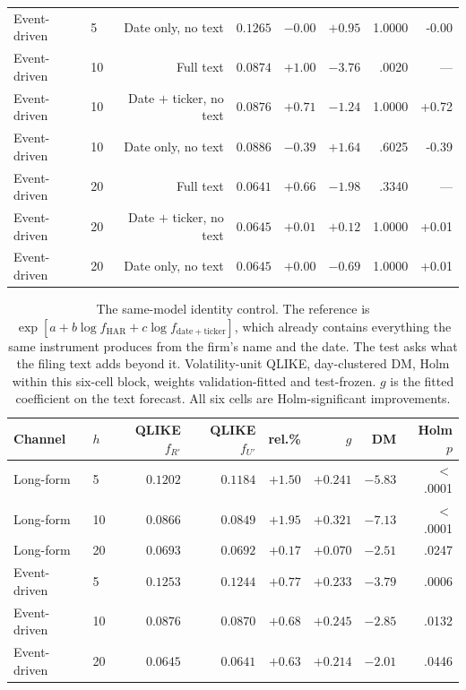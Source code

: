 \begin{table}[htbp]
\begin{tabular}{@{}llrrrrrr@{}}
Event-driven & 5 & Date only, no text & $0.1265$ & $-0.00$ & $+0.95$ & 1.0000 & -0.00 \\
\addlinespace
Event-driven & 10 & Full text & $0.0874$ & $+1.00$ & $-3.76$ & .0020 & --- \\
Event-driven & 10 & Date $+$ ticker, no text & $0.0876$ & $+0.71$ & $-1.24$ & 1.0000 & +0.72 \\
Event-driven & 10 & Date only, no text & $0.0886$ & $-0.39$ & $+1.64$ & .6025 & -0.39 \\
\addlinespace
Event-driven & 20 & Full text & $0.0641$ & $+0.66$ & $-1.98$ & .3340 & --- \\
Event-driven & 20 & Date $+$ ticker, no text & $0.0645$ & $+0.01$ & $+0.12$ & 1.0000 & +0.01 \\
Event-driven & 20 & Date only, no text & $0.0645$ & $+0.00$ & $-0.69$ & 1.0000 & +0.01 \\
\bottomrule
\end{tabular}
\end{table}

\begin{table}[htbp]
\centering
\caption[Full text beyond the model's own identity forecast]{The same-model
identity control. The reference is
$\exp[a + b\log f_{\mathrm{HAR}} + c\log f_{\mathrm{date+ticker}}]$, which
already contains everything the same instrument produces from the firm's
name and the date. The test asks what the filing text adds beyond
it. Volatility-unit QLIKE, day-clustered DM, Holm within this six-cell
block, weights validation-fitted and test-frozen. $g$ is the fitted
coefficient on the text forecast. All six cells are Holm-significant
improvements.}
\label{tab:app-contam-joint}
\singlespacing\small
\setlength{\tabcolsep}{4pt}
\begin{tabular}{@{}llrrrrrr@{}}
\toprule
Channel & $h$ & QLIKE $f_{R'}$ & QLIKE $f_{U'}$ & rel.\% & $g$ & DM & Holm $p$ \\
\midrule
Long-form & 5 & $0.1202$ & $0.1184$ & $+1.50$ & $+0.241$ & $-5.83$ & $<$.0001 \\
Long-form & 10 & $0.0866$ & $0.0849$ & $+1.95$ & $+0.321$ & $-7.13$ & $<$.0001 \\
Long-form & 20 & $0.0693$ & $0.0692$ & $+0.17$ & $+0.070$ & $-2.51$ & .0247 \\
Event-driven & 5 & $0.1253$ & $0.1244$ & $+0.77$ & $+0.233$ & $-3.79$ & .0006 \\
Event-driven & 10 & $0.0876$ & $0.0870$ & $+0.68$ & $+0.245$ & $-2.85$ & .0132 \\
Event-driven & 20 & $0.0645$ & $0.0641$ & $+0.63$ & $+0.214$ & $-2.01$ & .0446 \\
\bottomrule
\end{tabular}
\end{table}

